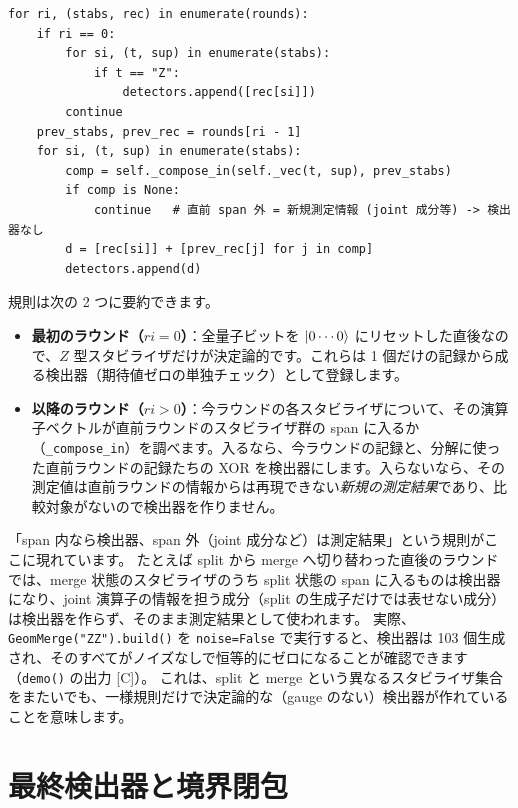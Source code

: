 \begin{lstlisting}[caption={一様検出器則（src/stages/01\_mpp/src/ftqc/geom\_lattice\_surgery.py build 内）}]
for ri, (stabs, rec) in enumerate(rounds):
    if ri == 0:
        for si, (t, sup) in enumerate(stabs):
            if t == "Z":
                detectors.append([rec[si]])
        continue
    prev_stabs, prev_rec = rounds[ri - 1]
    for si, (t, sup) in enumerate(stabs):
        comp = self._compose_in(self._vec(t, sup), prev_stabs)
        if comp is None:
            continue   # 直前 span 外 = 新規測定情報 (joint 成分等) -> 検出器なし
        d = [rec[si]] + [prev_rec[j] for j in comp]
        detectors.append(d)
\end{lstlisting}

規則は次の 2 つに要約できます。

\begin{itemize}
  \item \textbf{最初のラウンド（$ri=0$）}：全量子ビットを $\ket{0\cdots0}$ にリセットした直後なので、$Z$ 型スタビライザだけが決定論的です。これらは 1 個だけの記録から成る検出器（期待値ゼロの単独チェック）として登録します。
  \item \textbf{以降のラウンド（$ri>0$）}：今ラウンドの各スタビライザについて、その演算子ベクトルが直前ラウンドのスタビライザ群の span に入るか（\texttt{\_compose\_in}）を調べます。入るなら、今ラウンドの記録と、分解に使った直前ラウンドの記録たちの XOR を検出器にします。入らないなら、その測定値は直前ラウンドの情報からは再現できない\emph{新規の測定結果}であり、比較対象がないので検出器を作りません。
\end{itemize}

「span 内なら検出器、span 外（joint 成分など）は測定結果」という規則がここに現れています。
たとえば split から merge へ切り替わった直後のラウンドでは、merge 状態のスタビライザのうち split 状態の span に入るものは検出器になり、joint 演算子の情報を担う成分（split の生成子だけでは表せない成分）は検出器を作らず、そのまま測定結果として使われます。
実際、\texttt{GeomMerge("ZZ").build()} を \texttt{noise=False} で実行すると、検出器は 103 個生成され、そのすべてがノイズなしで恒等的にゼロになることが確認できます（\texttt{demo()} の出力 [C]）。
これは、split と merge という異なるスタビライザ集合をまたいでも、一様規則だけで決定論的な（gauge のない）検出器が作れていることを意味します。

\section{最終検出器と境界閉包}\label{sec:closure}

